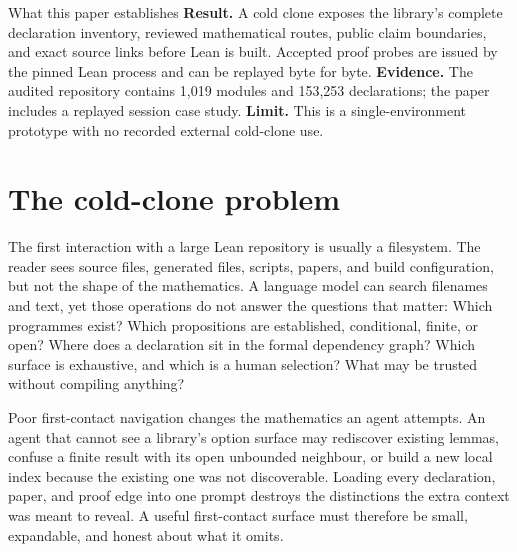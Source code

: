 \documentclass[11pt]{article}
\begin{document}
\begin{paperresult}{What this paper establishes}
\textbf{Result.} A cold clone exposes the library's complete declaration
inventory, reviewed mathematical routes, public claim boundaries, and exact
source links before Lean is built.  Accepted proof probes are issued by the
pinned Lean process and can be replayed byte for byte.  \textbf{Evidence.}
The audited repository contains 1,019 modules and 153,253 declarations; the
paper includes a replayed session case study.  \textbf{Limit.} This is a
single-environment prototype with no recorded external cold-clone use.
\end{paperresult}

\section{The cold-clone problem}\label{sec:problem}

The first interaction with a large Lean repository is usually a filesystem.
The reader sees source files, generated files, scripts, papers, and build
configuration, but not the shape of the mathematics. A language model can
search filenames and text, yet those operations do not answer the questions
that matter: Which programmes exist? Which propositions are established,
conditional, finite, or open? Where does a declaration sit in the formal
dependency graph? Which surface is exhaustive, and which is a human selection?
What may be trusted without compiling anything?

Poor first-contact navigation changes the mathematics an agent attempts. An
agent that cannot see a library's option surface may rediscover existing
lemmas, confuse a finite result with its open unbounded neighbour, or build a
new local index because the existing one was not discoverable. Loading every declaration,
paper, and proof edge into one prompt destroys the distinctions the extra
context was meant to reveal. A useful first-contact surface must therefore be
small, expandable, and honest about what it omits.
\end{document}
